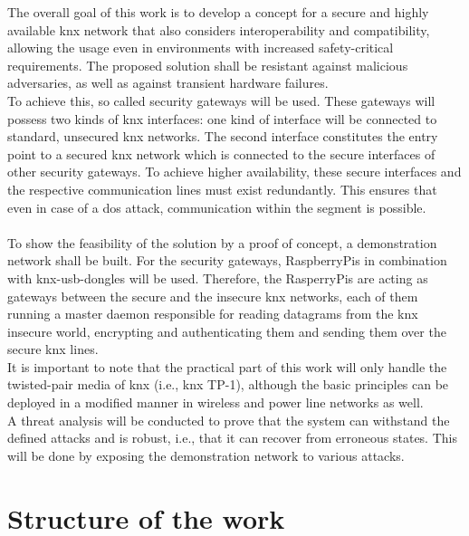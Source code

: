 The overall goal of this work is to develop a concept for a secure and highly available \gls{knx} network that also considers interoperability and compatibility, 
allowing the usage even in environments with increased safety-critical requirements. The proposed solution shall be resistant against malicious adversaries, as well as against
transient hardware failures.
\\
To achieve this, so called security gateways will be used. These gateways will possess two kinds of \gls{knx} interfaces: one kind of interface will be
connected to standard, unsecured \gls{knx} networks.
The second interface constitutes the entry point to a secured \gls{knx} network which is connected to the secure interfaces of other
security gateways. To achieve higher availability, these secure interfaces and the respective communication lines must exist redundantly. This ensures that
even in case of a \gls{dos} attack, communication within the segment is possible.
\\
\\
To show the feasibility of the solution by a proof of concept, a demonstration network shall be built.
For the security gateways, RaspberryPis in combination with \gls{knx}-\gls{usb}-dongles will be used. Therefore, the RasperryPis
are acting as gateways between the secure and the insecure \gls{knx} networks, each of them running a master daemon responsible
for reading datagrams from the \gls{knx} insecure world, encrypting and authenticating them and sending them over the secure
\gls{knx} lines.
\\
It is important to note that the practical part of this work will only
handle the twisted-pair media of \gls{knx} (i.e., \gls{knx} \gls{TP}-1), although the basic principles can be deployed in a modified manner in
wireless and power line networks as well.
\\
A threat analysis will be conducted to prove that the system can withstand the defined attacks and is robust,
i.e., that it can recover from erroneous states. This will be done by exposing the demonstration network to various attacks. 

\section{Structure of the work}

